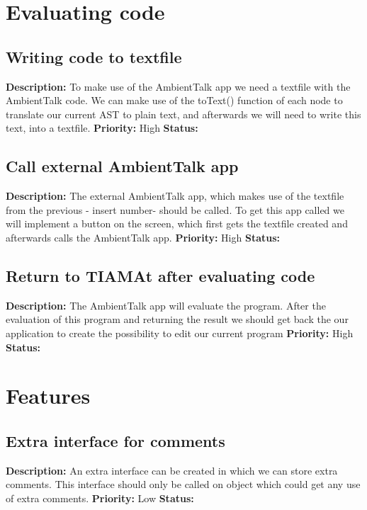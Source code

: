 \documentclass{article}
\begin{document}
\section{Evaluating code}
\subsection{Writing code to textfile}
\textbf{Description: }To make use of the AmbientTalk app we need a textfile with the AmbientTalk code. We can make use of the toText() function of each node to translate our
current AST to plain text, and afterwards we will need to write this text, into a textfile.  \newline
\textbf{Priority:} High \newline
\textbf{Status: } \newline
\subsection{Call external AmbientTalk app}
\textbf{Description: }The external AmbientTalk app, which makes use of the textfile from the previous - insert number- should be called. To get this app called we will implement
a button on the screen, which first gets the textfile created and afterwards calls the AmbientTalk app. \newline
\textbf{Priority:} High \newline
\textbf{Status: } \newline
\subsection{Return to TIAMAt after evaluating code}
\textbf{Description: } The AmbientTalk app will evaluate the program. After the evaluation of this program and returning the result we should get back the our application to
create the possibility to edit our current program\newline
\textbf{Priority:} High \newline
\textbf{Status: } \newline
\section{Features}
\subsection{Extra interface for comments}
\textbf{Description: } An extra interface can be created in which we can store extra comments. This interface should only be called on object which could get any use of extra comments.
 \newline
\textbf{Priority:} Low \newline
\textbf{Status: } \newline
\end{document}
